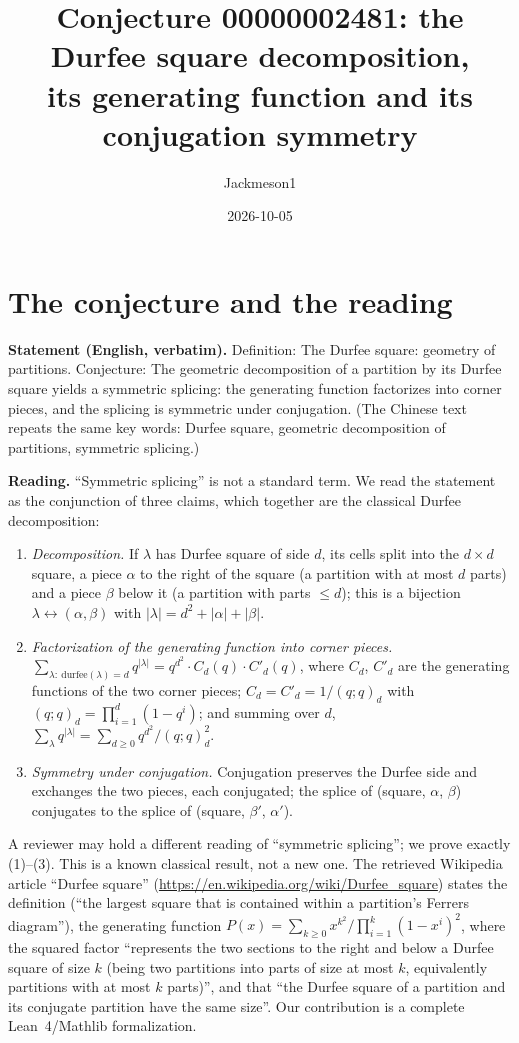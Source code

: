 \documentclass[11pt]{article}
\title{Conjecture 00000002481: the Durfee square decomposition,\\ its generating function and its conjugation symmetry}
\author{Jackmeson1}
\date{2026-10-05}
\theoremstyle{definition}
\begin{document}
\maketitle

\section{The conjecture and the reading}

\textbf{Statement (English, verbatim).} Definition: The Durfee square: geometry of partitions.
Conjecture: The geometric decomposition of a partition by its Durfee square yields a symmetric
splicing: the generating function factorizes into corner pieces, and the splicing is symmetric
under conjugation. (The Chinese text repeats the same key words: Durfee square, geometric
decomposition of partitions, symmetric splicing.)

\textbf{Reading.} ``Symmetric splicing'' is not a standard term. We read the statement as the
conjunction of three claims, which together are the classical Durfee decomposition:
\begin{enumerate}
\item[(1)] \emph{Decomposition.} If $\lambda$ has Durfee square of side $d$, its cells split
  into the $d\times d$ square, a piece $\alpha$ to the right of the square (a partition with at
  most $d$ parts) and a piece $\beta$ below it (a partition with parts $\le d$); this is a
  bijection $\lambda\leftrightarrow(\alpha,\beta)$ with $|\lambda|=d^2+|\alpha|+|\beta|$.
\item[(2)] \emph{Factorization of the generating function into corner pieces.}
  $\sum_{\lambda:\ \mathrm{durfee}(\lambda)=d} q^{|\lambda|}
  = q^{d^2}\cdot C_d(q)\cdot C'_d(q)$, where $C_d$, $C'_d$ are the generating functions of the two
  corner pieces; $C_d=C'_d=1/(q;q)_d$ with $(q;q)_d=\prod_{i=1}^d(1-q^i)$; and summing over $d$,
  $\sum_\lambda q^{|\lambda|}=\sum_{d\ge 0} q^{d^2}/(q;q)_d^2$.
\item[(3)] \emph{Symmetry under conjugation.} Conjugation preserves the Durfee side and exchanges
  the two pieces, each conjugated; the splice of (square, $\alpha$, $\beta$) conjugates to the
  splice of (square, $\beta'$, $\alpha'$).
\end{enumerate}
A reviewer may hold a different reading of ``symmetric splicing''; we prove exactly (1)--(3).
This is a known classical result, not a new one. The retrieved Wikipedia article ``Durfee square''
(\url{https://en.wikipedia.org/wiki/Durfee_square}) states the definition (``the largest square
that is contained within a partition's Ferrers diagram''), the generating function
$P(x)=\sum_{k\ge 0} x^{k^2}/\prod_{i=1}^k(1-x^i)^2$, where the squared factor ``represents the two
sections to the right and below a Durfee square of size $k$ (being two partitions into parts of
size at most $k$, equivalently partitions with at most $k$ parts)'', and that ``the Durfee square
of a partition and its conjugate partition have the same size''. Our contribution is a complete
Lean~4/Mathlib formalization.
\end{document}
